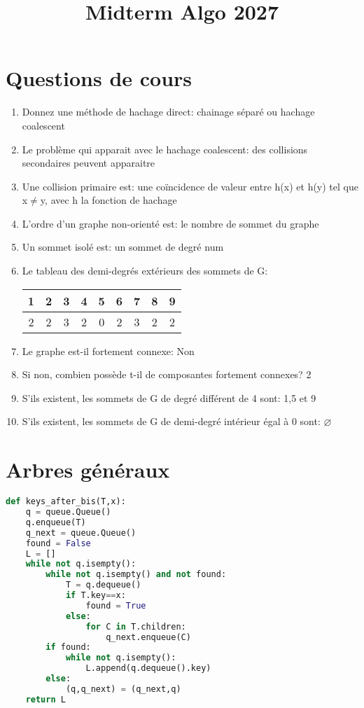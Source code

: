 \documentclass{article}
\author{}
\date{}
\title{Midterm Algo 2027}
\begin{document}
\maketitle

\section{Questions de cours}
\begin{enumerate}
    \item Donnez une méthode de hachage direct: chainage séparé ou hachage coalescent
    \item Le problème qui apparait avec le hachage coalescent: des collisions secondaires peuvent apparaitre
    \item Une collision primaire est: une coïncidence de valeur entre h(x) et h(y) tel que x$\neq$y, avec h la fonction de hachage
    \item L'ordre d'un graphe non-orienté est: le nombre de sommet du graphe
    \item Un sommet isolé est: un sommet de degré num
    \item Le tableau des demi-degrés extérieurs des sommets de G:
    \begin{center}
    \begin{tabular}{ |c| c| c| c| c| c| c| c| c| }
        \hline
        1 & 2 & 3 & 4 & 5 & 6 & 7 & 8 & 9 \\
        \hline
        2 & 2 & 3 & 2 & 0 & 2 & 3 & 2 & 2 \\
        \hline
    \end{tabular}
    \end{center}
    \item Le graphe est-il fortement connexe: Non
    \item Si non, combien possède t-il de composantes fortement connexes? 2
    \item S'ils existent, les sommets de G de degré différent de 4 sont: 1,5 et 9
    \item S'ils existent, les sommets de G de demi-degré intérieur égal à 0 sont: $\varnothing$
\end{enumerate}

\newpage
\section{Arbres généraux}
\begin{lstlisting}[language=Python]
  def keys_after_bis(T,x):
    q = queue.Queue()
    q.enqueue(T)
    q_next = queue.Queue()
    found = False
    L = []
    while not q.isempty():
        while not q.isempty() and not found:
            T = q.dequeue()
            if T.key==x:
                found = True
            else:
                for C in T.children:
                    q_next.enqueue(C)
        if found:
            while not q.isempty():
                L.append(q.dequeue().key)
        else:
            (q,q_next) = (q_next,q)
    return L
\end{lstlisting}
\end{document}
